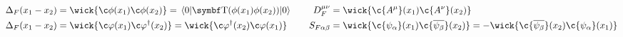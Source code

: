\begin{alignat*}{4}
        \Delta_F(x_1-x_2)
        &= \wick{\c\phi(x_1)\c\phi(x_2)}
        =  \mel{0}{\Tordp(\phi(x_1)\phi(x_2))}{0}
        &\quad
        D_F^{\mu\nu}
        &= \wick{\c{A^{\mu}}(x_1)\c{A^\nu}(x_2)}
        \\
        \Delta_F(x_1-x_2)
        &= \wick{\c\varphi(x_1)\c\varphi^\dagger(x_2)}
        =  \wick{\c\varphi^\dagger(x_2)\c\varphi(x_1)}
        &\quad
        S_{F\alpha\beta}
        &= \wick{\c{\psi_\alpha}(x_1)\c{\overline{\psi_\beta}}(x_2)}
        = -\wick{\c{\overline{\psi_\beta}}(x_2) \c{\psi_\alpha}(x_1)}
\end{alignat*}
